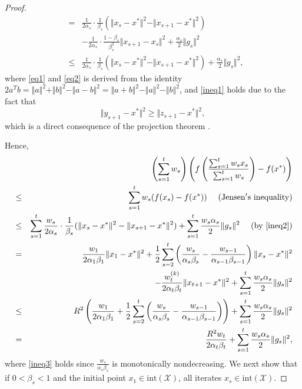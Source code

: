 \documentclass[sn-mathphys]{JORSC-jnl}%
\theoremstyle{thmstyleone}%
\theoremstyle{thmstylethree}%
\begin{document}
\begin{proof}
\begin{eqnarray}
		&=& \frac{1}{2\alpha_s}\cdot\frac{1}{\beta_s}(\Vert x_s-x^* \Vert^2-\Vert x_{s+1}-x^* \Vert^2)\nonumber\\
		&&-\frac{1}{2\alpha_s}\cdot\frac{1-\beta_s}{\beta_s^2}\Vert x_{s+1}-x_s \Vert^2+\frac{\alpha_s}{2}\Vert g_s \Vert^2\nonumber\\
		&\leq& \frac{1}{2\alpha_s}\cdot\frac{1}{\beta_s}(\Vert x_s-x^* \Vert^2-\Vert x_{s+1}-x^* \Vert^2)+\frac{\alpha_s}{2}\Vert g_s \Vert^2 ,\label{ineq2}
	\end{eqnarray}
	where \eqref{eq1} and \eqref{eq2} is derived from the identity $2a^Tb=\Vert a\Vert^2+\Vert b\Vert^2-\Vert a-b\Vert^2=\Vert a+b\Vert^2-\Vert a\Vert^2-\Vert b\Vert^2$, and \eqref{ineq1} holds due to the fact that
	\begin{equation*}
		\Vert y_{s+1}-x^* \Vert^2\geqslant \Vert z_{s+1}-x^* \Vert^2,
	\end{equation*}
	which is a direct consequence of the projection theorem \cite[Lemma 3.1]{bubeck2015convex}. 
	
	Hence,
	\begin{eqnarray}
		&& \left(\sum_{s=1}^{t}w_s\right)\left(f\left( \frac{\sum_{s=1}^t w_s x_s}{\sum_{s=1}^t w_s} \right) - f(x^*)\right)\nonumber\\
		&\leq&\sum_{s=1}^t w_s(f(x_s)-f(x^*))  ~~~~({\rm Jensen's~ inequality})\nonumber\\
		&\leq&\sum_{s=1}^t \frac{w_s}{2\alpha_s }\cdot\frac{1}{\beta_s}(\Vert x_s-x^* \Vert^2-\Vert x_{s+1}-x^* \Vert^2)+\sum_{s=1}^t\frac{w_s\alpha_s}{2}\Vert g_s \Vert^2 ~~~~({\rm by~ \eqref{ineq2}}) \nonumber\\
		&=& \frac{w_1}{2\alpha_1\beta_1}\Vert x_1-x^* \Vert^2+\frac{1}{2}\sum_{s=2}^t\left(\frac{w_s}{ \alpha_s\beta_s }-\frac{w_{s-1}}{ \alpha_{s-1}\beta_{s-1}}\right)\Vert x_s-x^* \Vert^2\nonumber\\
		&& -\frac{w_t^{(k)}}{ 2\alpha_{t}\beta_t }\Vert x_{t+1}-x^* \Vert^2+\sum_{s=1}^t\frac{w_s\alpha_s}{2}\Vert g_s \Vert^2\nonumber\\
		&\leq& R^2 \left( \frac{w_1}{2\alpha_1\beta_1}+\frac{1}{2}\sum_{s=2}^t\left(\frac{w_s}{ \alpha_s\beta_s }-\frac{w_{s-1}}{ \alpha_{s-1}\beta_{s-1}}\right) \right)+\sum_{s=1}^t\frac{w_s\alpha_s}{2}\Vert g_s \Vert^2 \label{ineq3}\\
		&=& \frac{R^2 w_t}{2\alpha_t\beta_t}+\sum_{s=1}^t\frac{w_s\alpha_s}{2}\Vert g_s \Vert^2, \nonumber
	\end{eqnarray}
	where \eqref{ineq3} holds since $\frac{w_s}{\alpha_s\beta_s}$ is monotonically nondecreasing. We next show that if $0 < \beta_s <1$ and the initial point $x_1 \in \text{int}(\mathcal{X})$, all iterates $x_s \in \text{int}(\mathcal{X})$.
	

\end{proof}
\end{document}
